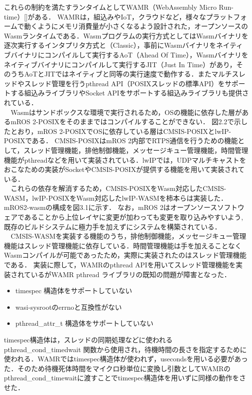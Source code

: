これらの制約を満たすランタイムとしてWAMR（WebAssembly Micro Run-time）[]がある．
WAMRは，組込みやIoT，クラウドなど，様々なプラットフォームで動くようにメモリ消費量が小さくなるよう設計された，オープンソースのWasmランタイムである．Wasmプログラムの実行方式としてはWasmバイナリを逐次実行するインタプリタ方式と（Classic），事前にWasmバイナリをネイティブバイナリにコンパイルして実行するAoT（Ahead Of Time），Wasmバイナリをネイティブバイナリにコンパイルして実行するJIT（Just In Time）があり，そのうちAoTとJITではネイティブと同等の実行速度で動作する．またマルチスレッドやスレッド管理を行うpthread API（POSIXスレッドの標準API）をサポートする組込みライブラリやSocket APIをサポートする組込みライブラリも提供されている．\\　Wasmはサンドボックスな環境で実行されるため，OSの機能に依存した層があるmROS 2-POSIXをそのままではコンパイルすることができない．
図2.2で示したとおり，mROS 2-POSIXでOSに依存している層はCMSIS-POSIXとlwIP-POSIXである．
CMSIS-POSIXはmROS 2内部でRTPS通信を行うための機能として，スレッド管理機能，排他制御機能，メッセージキュー管理機能，時間管理機能がpthreadなどを用いて実装されている．lwIPでは，UDPマルチキャストをおこなための実装がSocketやCMSIS-POSIXが提供する機能を用いて実装されている．
\\　これらの依存を解消するため，CMSIS-POSIXをWasm対応したCMSIS-WASM，lwIP-POSIXをWasm対応したlwIP-WASMを柿本らは実装した．
mROS2-wasmの構成を図3.1に示す．
なお，mROS 2はオープンソースソフトウェアであることから上位レイヤに変更が加わっても変更を取り込みやすいよう,既存のビルドシステムに極力手を加えずにシステムを構築されている．
\\　CMSIS-WASMを実装する機能のうち，排他制御機能，メッセージキュー管理機能はスレッド管理機能に依存している．時間管理機能は手を加えることなくWasmコンパイルが可能であったため，実際に実装されたのはスレッド管理機能である．
実装に際して，WAMRのpthread APIを用いてスレッド管理機能を実装されているがWAMR pthread ライブラリの既知の問題が障害となった．
\begin{itemize}
    \item timespec 構造体をサポートしていない
    \item wasi-sysrootのerrnoと互換性がない
    \item pthread\_attr\_t 構造体をサポートしていない
\end{itemize}
timespec構造体は，スレッドの同期処理などに使われるpthread\_cond\_timedwait 関数から使用され，待機時間の長さを指定するために使われる．WAMRではtimespec構造体が使われず，usecondsを用いる必要があった．そのため待機死体時間をマイクロ秒単位に変換し引数としてWAMRのpthread\_cond\_timewaitに渡すことでtimespec構造体を用いずに同様の動作をさせた．
